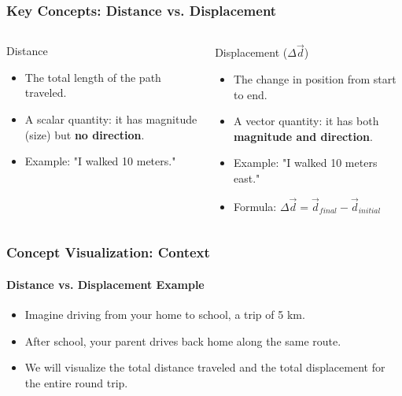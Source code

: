 \documentclass{beamer}
\begin{document}
\begin{frame}
\frametitle{Key Concepts: Distance vs. Displacement}
\begin{columns}[T]
    \begin{block}{Distance}
        \begin{itemize}
            \item The total length of the path traveled.
            \item A \alert{scalar} quantity: it has magnitude (size) but \textbf{no direction}.
            \item Example: "I walked 10 meters."
        \end{itemize}
    \end{block}
    \pause
    \begin{block}{Displacement ($\Delta \vec{d}$)}
        \begin{itemize}
            \item The change in position from start to end.
            \item A \alert{vector} quantity: it has both \textbf{magnitude and direction}.
            \item Example: "I walked 10 meters \alert{east}."
            \item Formula: $\Delta \vec{d} = \vec{d}_{final} - \vec{d}_{initial}$
        \end{itemize}
    \end{block}
\end{columns}
\end{frame}

\begin{frame}
\frametitle{Concept Visualization: Context}
\framesubtitle{Distance vs. Displacement Example}
\begin{itemize}
    \item Imagine driving from your home to school, a trip of 5 km.
    \pause
    \item After school, your parent drives back home along the same route.
    \pause
    \item We will visualize the \alert{total distance} traveled and the \alert{total displacement} for the entire round trip.
\end{itemize}
\end{frame}
\end{document}
